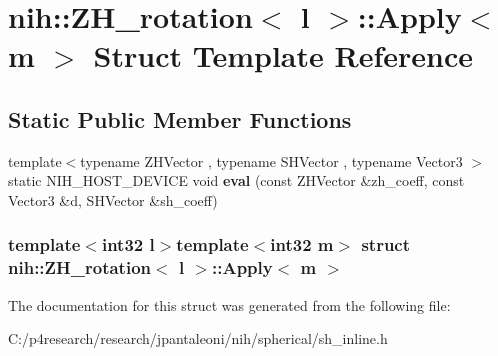 \hypertarget{structnih_1_1_z_h__rotation_1_1_apply}{
\section{nih\-:\-:\-Z\-H\-\_\-rotation$<$ l $>$\-:\-:\-Apply$<$ m $>$ \-Struct \-Template \-Reference}
\label{structnih_1_1_z_h__rotation_1_1_apply}
}
\subsection*{\-Static \-Public \-Member \-Functions}
\begin{DoxyCompactItemize}
\item 
\hypertarget{structnih_1_1_z_h__rotation_1_1_apply_a879b6f830c072283d6467cffbd25c9d9}{
{\footnotesize template$<$typename Z\-H\-Vector , typename S\-H\-Vector , typename Vector3 $>$ }\\static \-N\-I\-H\-\_\-\-H\-O\-S\-T\-\_\-\-D\-E\-V\-I\-C\-E void {\bfseries eval} (const \-Z\-H\-Vector \&zh\-\_\-coeff, const \-Vector3 \&d, \-S\-H\-Vector \&sh\-\_\-coeff)}
\label{structnih_1_1_z_h__rotation_1_1_apply_a879b6f830c072283d6467cffbd25c9d9}

\end{DoxyCompactItemize}
\subsubsection*{template$<$int32 l$>$template$<$int32 m$>$ struct nih\-::\-Z\-H\-\_\-rotation$<$ l $>$\-::\-Apply$<$ m $>$}



\-The documentation for this struct was generated from the following file\-:\begin{DoxyCompactItemize}
\item 
\-C\-:/p4research/research/jpantaleoni/nih/spherical/sh\-\_\-inline.\-h\end{DoxyCompactItemize}
